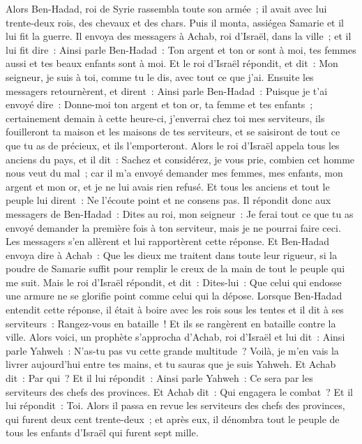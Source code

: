 \begin{multicols}{2}
\VerseOne{}Alors Ben-Hadad, roi de Syrie rassembla toute son armée~; il avait avec lui trente-deux rois, des chevaux et des chars. Puis il monta, assiégea Samarie et il lui fit la guerre.
Il envoya des messagers à Achab, roi d'Israël, dans la ville~;
et il lui fit dire~: Ainsi parle Ben-Hadad~: Ton argent et ton or sont à moi, tes femmes aussi et tes beaux enfants sont à moi.
Et le roi d'Israël répondit, et dit~: Mon seigneur, je suis à toi, comme tu le dis, avec tout ce que j'ai.
Ensuite les messagers retournèrent, et dirent~: Ainsi parle Ben-Hadad~: Puisque je t'ai envoyé dire~: Donne-moi ton argent et ton or, ta femme et tes enfants~;
certainement demain à cette heure-ci, j'enverrai chez toi mes serviteurs, ils fouilleront ta maison et les maisons de tes serviteurs, et se saisiront de tout ce que tu as de précieux, et ils l'emporteront.
Alors le roi d'Israël appela tous les anciens du pays, et il dit~: Sachez et considérez, je vous prie, combien cet homme nous veut du mal~; car il m'a envoyé demander mes femmes, mes enfants, mon argent et mon or, et je ne lui avais rien refusé.
Et tous les anciens et tout le peuple lui dirent~: Ne l'écoute point et ne consens pas.
Il répondit donc aux messagers de Ben-Hadad~: Dites au roi, mon seigneur~: Je ferai tout ce que tu as envoyé demander la première fois à ton serviteur, mais je ne pourrai faire ceci. Les messagers s'en allèrent et lui rapportèrent cette réponse.
Et Ben-Hadad envoya dire à Achab~: Que les dieux me traitent dans toute leur rigueur, si la poudre de Samarie suffit pour remplir le creux de la main de tout le peuple qui me suit.
Mais le roi d'Israël répondit, et dit~: Dites-lui~: Que celui qui endosse une armure ne se glorifie point comme celui qui la dépose.
Lorsque Ben-Hadad entendit cette réponse, il était à boire avec les rois sous les tentes et il dit à ses serviteurs~: Rangez-vous en bataille~! Et ils se rangèrent en bataille contre la ville.
Alors voici, un prophète s'approcha d'Achab, roi d'Israël et lui dit~: Ainsi parle Yahweh~: N'as-tu pas vu cette grande multitude~? Voilà, je m'en vais la livrer aujourd'hui entre tes mains, et tu sauras que je suis Yahweh.
Et Achab dit~: Par qui~? Et il lui répondit~: Ainsi parle Yahweh~: Ce sera par les serviteurs des chefs des provinces. Et Achab dit~: Qui engagera le combat~? Et il lui répondit~: Toi.
Alors il passa en revue les serviteurs des chefs des provinces, qui furent deux cent trente-deux~; et après eux, il dénombra tout le peuple de tous les enfants d'Israël qui furent sept mille.

\end{multicols}
